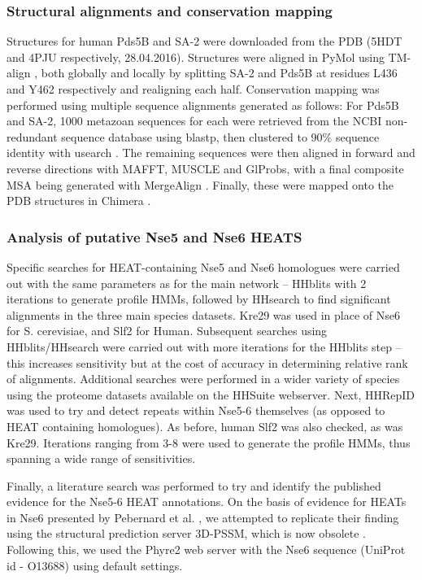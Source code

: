 \documentclass[a4paper,11pt,twoside,openright]{scrbook}
\begin{document}
\subsubsection{Structural alignments and conservation mapping}
Structures for human Pds5B and SA-2 were downloaded from the PDB (5HDT \cite{Ouyang2016} and 4PJU \cite{Hara2014} respectively, 28.04.2016). Structures were aligned in PyMol using TM-align \cite{PyMol2016,Zhang2005}, both globally and locally by splitting SA-2 and Pds5B at residues L436 and Y462 respectively and realigning each half. Conservation mapping was performed using multiple sequence alignments generated as follows: For Pds5B and SA-2, 1000 metazoan sequences for each were retrieved from the NCBI non-redundant sequence database using blastp, then clustered to 90\% sequence identity with usearch \cite{Altschul1990,Edgar2010}. The remaining sequences were then aligned in forward and reverse directions with MAFFT, MUSCLE and GlProbs, with a final composite MSA being generated with MergeAlign \cite{Katoh2002,Edgar2004,Ye2015,Collingridge2012}. Finally, these were mapped onto the PDB structures in Chimera \cite{Pettersen2004}.

\subsubsection{Analysis of putative Nse5 and Nse6 HEATS}
Specific searches for HEAT-containing Nse5 and Nse6 homologues were carried out with the same parameters as for the main network – HHblits with 2 iterations to generate profile HMMs, followed by HHsearch to find significant alignments in the three main species datasets. Kre29 was used in place of Nse6 for S. cerevisiae, and Slf2 for Human. Subsequent searches using HHblits/HHsearch were carried out with more iterations for the HHblits step – this increases sensitivity but at the cost of accuracy in determining relative rank of alignments. Additional searches were performed in a wider variety of species using the proteome datasets available on the HHSuite webserver. Next, HHRepID \cite{Biegert2008} was used to try and detect repeats within Nse5-6 themselves (as opposed to HEAT containing homologues). As before, human Slf2 was also checked, as was Kre29. Iterations ranging from 3-8 were used to generate the profile HMMs, thus spanning a wide range of sensitivities.

Finally, a literature search was performed to try and identify the published evidence for the Nse5-6 HEAT annotations. On the basis of evidence for HEATs in Nse6 presented by Pebernard et al. \cite{Pebernard2006}, we attempted to replicate their finding using the structural prediction server 3D-PSSM, which is now obsolete \cite{Kelley2000}. Following this, we used the Phyre2 web server \cite{Kelley2015} with the Nse6 sequence (UniProt id - O13688) using default settings.
\end{document}
